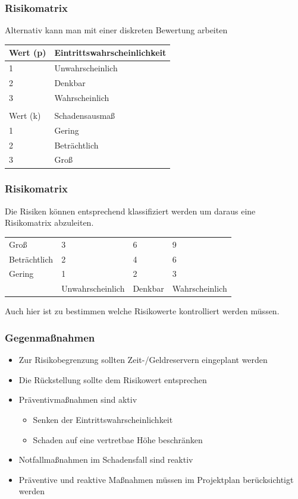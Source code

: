 \begin{frame}
\frametitle{Risikomatrix}
	Alternativ kann man mit einer diskreten Bewertung arbeiten
		\begin{table}[]
			\begin{tabular}{ll}
			 Wert (p) & Eintrittswahrscheinlichkeit \\
			 \hline
			 1 & Unwahrscheinlich \\
			 2 & Denkbar \\
			 3 & Wahrscheinlich \\
			 	 &	\\
			 Wert (k) & Schadensausmaß \\
			 \hline
			 1 & Gering \\
			 2 & Beträchtlich \\
			 3 & Groß
			\end{tabular}
		\end{table}
\end{frame}

\begin{frame}
\frametitle{Risikomatrix}
	Die Risiken können entsprechend klassifiziert werden um daraus eine Risikomatrix
	abzuleiten.
	\bigskip
	\begin{small}
		\begin{table}[]
			\begin{tabular}{l|lll}
			 Groß 				& \cellcolor[HTML]{FFCD69} 3 & \cellcolor[HTML]{FC6D58} 6 & \cellcolor[HTML]{D8334A} 9 \\
			 Beträchtlich & \cellcolor[HTML]{E8CE4D} 2 & \cellcolor[HTML]{F39C12} 4 & \cellcolor[HTML]{FC6D58} 6 \\
			 Gering 			& \cellcolor[HTML]{9FD477} 1 & \cellcolor[HTML]{E8CE4D} 2 & \cellcolor[HTML]{FFCD69} 3 \\
			 \hline
			 							& Unwahrscheinlich  				 & Denkbar 										& Wahrscheinlich
			\end{tabular}
		\end{table}
	\end{small}
	\bigskip
	Auch hier ist zu bestimmen welche Risikowerte kontrolliert werden müssen.
\end{frame}

\begin{frame}
\frametitle{Gegenmaßnahmen}
	\begin{itemize}
		\item Zur Risikobegrenzung sollten Zeit-/Geldreservern eingeplant werden
		\item Die Rückstellung sollte dem Risikowert entsprechen
		\item Präventivmaßnahmen sind aktiv
					\begin{itemize}
						\item Senken der Eintrittswahrscheinlichkeit
						\item Schaden auf eine vertretbae Höhe beschränken
					\end{itemize}
		\item Notfallmaßnahmen im Schadensfall sind reaktiv
		\item Präventive und reaktive Maßnahmen müssen im Projektplan berücksichtigt werden
	\end{itemize}
\end{frame}

